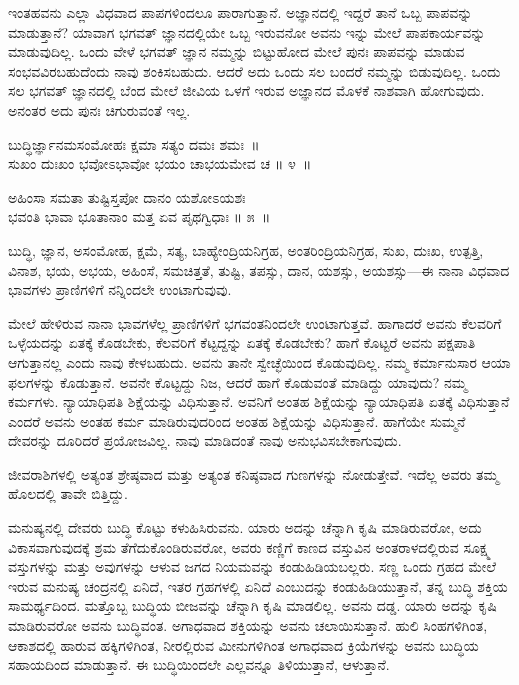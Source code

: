 ಇಂತಹವನು ಎಲ್ಲಾ ವಿಧವಾದ ಪಾಪಗಳಿಂದಲೂ ಪಾರಾಗುತ್ತಾನೆ. ಅಜ್ಞಾನದಲ್ಲಿ ಇದ್ದರೆ ತಾನೆ ಒಬ್ಬ ಪಾಪವನ್ನು ಮಾಡುತ್ತಾನೆ? ಯಾವಾಗ ಭಗವತ್ ಜ್ಞಾನದಲ್ಲಿಯೇ ಒಬ್ಬ ಇರುವನೋ ಅವನು ಇನ್ನು ಮೇಲೆ ಪಾಪಕಾರ್ಯವನ್ನು ಮಾಡುವುದಿಲ್ಲ. ಒಂದು ವೇಳೆ ಭಗವತ್ ಜ್ಞಾನ ನಮ್ಮನ್ನು ಬಿಟ್ಟುಹೋದ ಮೇಲೆ ಪುನಃ ಪಾಪವನ್ನು ಮಾಡುವ ಸಂಭವವಿರಬಹುದೆಂದು ನಾವು ಶಂಕಿಸಬಹುದು. ಆದರೆ ಅದು ಒಂದು ಸಲ ಬಂದರೆ ನಮ್ಮನ್ನು ಬಿಡುವುದಿಲ್ಲ. ಒಂದು ಸಲ ಭಗವತ್ ಜ್ಞಾನದಲ್ಲಿ ಬೆಂದ ಮೇಲೆ ಜೀವಿಯ ಒಳಗೆ ಇರುವ ಅಜ್ಞಾನದ ಮೊಳಕೆ ನಾಶವಾಗಿ ಹೋಗುವುದು. ಅನಂತರ ಅದು ಪುನಃ ಚಿಗುರುವಂತೆ ಇಲ್ಲ.

\begin{shloka}
ಬುದ್ಧಿರ್ಜ್ಞಾನಮಸಂಮೋಹಃ ಕ್ಷಮಾ ಸತ್ಯಂ ದಮಃ ಶಮಃ~॥\\ಸುಖಂ ದುಃಖಂ ಭವೋಽಭಾವೋ ಭಯಂ ಚಾಭಯಮೇವ ಚ \hfill॥ ೪~॥
\end{shloka}

\begin{shloka}
ಅಹಿಂಸಾ ಸಮತಾ ತುಷ್ಟಿಸ್ತಪೋ ದಾನಂ ಯಶೋಽಯಶಃ\\ಭವಂತಿ ಭಾವಾ ಭೂತಾನಾಂ ಮತ್ತ ಏವ ಪೃಥಗ್ವಿಧಾಃ \hfill॥ ೫~॥
\end{shloka}

\begin{artha}
ಬುದ್ಧಿ, ಜ್ಞಾನ, ಅಸಂಮೋಹ, ಕ್ಷಮೆ, ಸತ್ಯ, ಬಾಹ್ಯೇಂದ್ರಿಯನಿಗ್ರಹ, ಅಂತರಿಂದ್ರಿಯನಿಗ್ರಹ, ಸುಖ, ದುಃಖ, ಉತ್ಪತ್ತಿ, ವಿನಾಶ, ಭಯ, ಅಭಯ, ಅಹಿಂಸೆ, ಸಮಚಿತ್ತತೆ, ತುಷ್ಟಿ, ತಪಸ್ಸು, ದಾನ, ಯಶಸ್ಸು, ಅಯಶಸ್ಸು—ಈ ನಾನಾ ವಿಧವಾದ ಭಾವಗಳು ಪ್ರಾಣಿಗಳಿಗೆ ನನ್ನಿಂದಲೇ ಉಂಟಾಗುವುವು.
\end{artha}

ಮೇಲೆ ಹೇಳಿರುವ ನಾನಾ ಭಾವಗಳೆಲ್ಲ ಪ್ರಾಣಿಗಳಿಗೆ ಭಗವಂತನಿಂದಲೇ ಉಂಟಾಗುತ್ತವೆ. ಹಾಗಾದರೆ ಅವನು ಕೆಲವರಿಗೆ ಒಳ್ಳೆಯದನ್ನು ಏತಕ್ಕೆ ಕೊಡಬೇಕು, ಕೆಲವರಿಗೆ ಕೆಟ್ಟದ್ದನ್ನು ಏತಕ್ಕೆ ಕೊಡಬೇಕು? ಹಾಗೆ ಕೊಟ್ಟರೆ ಅವನು ಪಕ್ಷಪಾತಿ ಆಗುತ್ತಾನಲ್ಲ ಎಂದು ನಾವು ಕೇಳಬಹುದು. ಅವನು ತಾನೇ ಸ್ವೇಚ್ಛೆಯಿಂದ ಕೊಡುವುದಿಲ್ಲ. ನಮ್ಮ ಕರ್ಮಾನುಸಾರ ಆಯಾ ಫಲಗಳನ್ನು ಕೊಡುತ್ತಾನೆ. ಅವನೇ ಕೊಟ್ಟದ್ದು ನಿಜ, ಆದರೆ ಹಾಗೆ ಕೊಡುವಂತೆ ಮಾಡಿದ್ದು ಯಾವುದು? ನಮ್ಮ ಕರ್ಮಗಳು. ನ್ಯಾಯಾಧಿಪತಿ ಶಿಕ್ಷೆಯನ್ನು ವಿಧಿಸುತ್ತಾನೆ. ಅವನಿಗೆ ಅಂತಹ ಶಿಕ್ಷೆಯನ್ನು ನ್ಯಾಯಾಧಿಪತಿ ಏತಕ್ಕೆ ವಿಧಿಸುತ್ತಾನೆ ಎಂದರೆ ಅವನು ಅಂತಹ ಕರ್ಮ ಮಾಡಿರುವುದರಿಂದ ಅಂತಹ ಶಿಕ್ಷೆಯನ್ನು ವಿಧಿಸುತ್ತಾನೆ. ಹಾಗೆಯೇ ಸುಮ್ಮನೆ ದೇವರನ್ನು ದೂರಿದರೆ ಪ್ರಯೋಜವಿಲ್ಲ. ನಾವು ಮಾಡಿದಂತೆ ನಾವು ಅನುಭವಿಸಬೇಕಾಗುವುದು.

ಜೀವರಾಶಿಗಳಲ್ಲಿ ಅತ್ಯಂತ ಶ್ರೇಷ್ಠವಾದ ಮತ್ತು ಅತ್ಯಂತ ಕನಿಷ್ಠವಾದ ಗುಣಗಳನ್ನು ನೋಡುತ್ತೇವೆ. ಇದೆಲ್ಲ ಅವರು ತಮ್ಮ ಹೊಲದಲ್ಲಿ ತಾವೇ ಬಿತ್ತಿದ್ದು.

ಮನುಷ್ಯನಲ್ಲಿ ದೇವರು ಬುದ್ಧಿ ಕೊಟ್ಟು ಕಳುಹಿಸಿರುವನು. ಯಾರು ಅದನ್ನು ಚೆನ್ನಾಗಿ ಕೃಷಿ ಮಾಡಿರುವರೋ, ಅದು ವಿಕಾಸವಾಗುವುದಕ್ಕೆ ಶ್ರಮ ತೆಗೆದುಕೊಂಡಿರುವರೋ, ಅವರು ಕಣ್ಣಿಗೆ ಕಾಣದ ವಸ್ತುವಿನ ಅಂತರಾಳದಲ್ಲಿರುವ ಸೂಕ್ಷ್ಮ ವಸ್ತುಗಳನ್ನು ಮತ್ತು ಅವುಗಳನ್ನು ಆಳುವ ಜಗದ ನಿಯಮವನ್ನು ಕಂಡುಹಿಡಿಯಬಲ್ಲರು. ಸಣ್ಣ ಒಂದು ಗ್ರಹದ ಮೇಲೆ ಇರುವ ಮನುಷ್ಯ ಚಂದ್ರನಲ್ಲಿ ಏನಿದೆ, ಇತರ ಗ್ರಹಗಳಲ್ಲಿ ಏನಿದೆ ಎಂಬುದನ್ನು ಕಂಡುಹಿಡಿಯುತ್ತಾನೆ, ತನ್ನ ಬುದ್ಧಿ ಶಕ್ತಿಯ ಸಾಮರ್ಥ್ಯದಿಂದ. ಮತ್ತೊಬ್ಬ ಬುದ್ಧಿಯ ಬೀಜವನ್ನು ಚೆನ್ನಾಗಿ ಕೃಷಿ ಮಾಡಲಿಲ್ಲ. ಅವನು ದಡ್ಡ. ಯಾರು ಅದನ್ನು ಕೃಷಿ ಮಾಡಿರುವರೋ ಅವನು ಬುದ್ಧಿವಂತ. ಅಗಾಧವಾದ ಶಕ್ತಿಯನ್ನು ಅವನು ಚಲಾಯಿಸುತ್ತಾನೆ. ಹುಲಿ ಸಿಂಹಗಳಿಗಿಂತ, ಆಕಾಶದಲ್ಲಿ ಹಾರುವ ಹಕ್ಕಿಗಳಿಗಿಂತ, ನೀರಲ್ಲಿರುವ ಮೀನುಗಳಿಗಿಂತ ಅಗಾಧವಾದ ಕ್ರಿಯೆಗಳನ್ನು ಅವನು ಬುದ್ಧಿಯ ಸಹಾಯದಿಂದ ಮಾಡುತ್ತಾನೆ. ಈ ಬುದ್ಧಿಯಿಂದಲೇ ಎಲ್ಲವನ್ನೂ ತಿಳಿಯುತ್ತಾನೆ, ಆಳುತ್ತಾನೆ.

